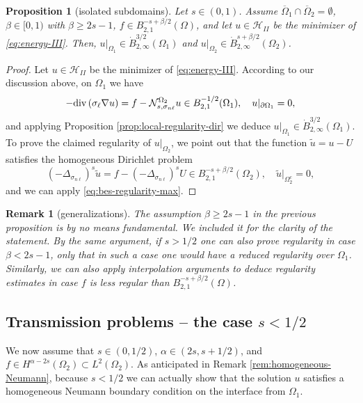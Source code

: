 \documentclass{amsart}
\newcommand{\Ol}{\Omega_{1}}%
\newcommand{\Onl}{\Omega_{2}}%
\renewcommand{\sl}{{\sigma_\ell}}
\newcommand{\snl}{{\sigma_{n\ell}}}
\def\calH{\mathcal{H}}
\newcommand{\Nsnl}{\mathcal{N}_{s,\snl}}
\renewcommand{\div}{{\rm div}\,}
\theoremstyle{plain}
\newtheorem{proposition}{Proposition}
\newtheorem{remark}{Remark}
\numberwithin{equation}{section}
\numberwithin{table}{section}
\numberwithin{figure}{section}
\numberwithin{theorem}{section}
\numberwithin{corollary}{section}
\numberwithin{definition}{section}
\numberwithin{lemma}{section}
\numberwithin{proposition}{section}
\numberwithin{remark}{section}
\begin{document}
\begin{proposition}[isolated subdomains] \label{prop:reg-isolated}
Let $s \in (0,1)$.
Assume $\overline\Ol \cap \overline \Onl = \emptyset$, $\beta \in [0,1)$ with $\beta \ge 2s - 1$, $f \in B^{-s+\beta/2}_{2,1}(\Omega)$, and let $u \in \calH_{II}$ be the minimizer of \eqref{eq:energy-III}. Then, $u|_{\Ol} \in \dot B^{3/2}_{2,\infty}(\Ol)$ and $u|_{\Onl} \in \dot B^{s+\beta/2}_{2,\infty}(\Onl)$.
\end{proposition}
\begin{proof}
Let $u \in \calH_{II}$ be the minimizer of \eqref{eq:energy-III}. According to our discussion above, on $\Ol$ we have
\[
-\div (\sl \nabla u)  = f  - \Nsnl^{\Onl} u \in B^{-1/2}_{2,1}(\Ol), \quad u |_{\partial \Ol} = 0,
\]
and applying Proposition \ref{prop:local-regularity-dir} we deduce $u|_{\Ol} \in \dot B^{3/2}_{2,\infty}(\Ol)$. To prove the claimed regularity of $u|_{\Onl}$, we point out that the function $\tilde u = u - U$ satisfies the homogeneous Dirichlet problem
\[
(-\Delta_\snl)^s \tilde{u}  = f  - (-\Delta_\snl)^s U \in B^{-s+\beta/2}_{2,1}(\Onl), \quad \tilde{u} |_{\Onl^c} = 0,
\]
and we can apply \eqref{eq:bes-regularity-max}.
\end{proof}

\begin{remark}[generalizations] 
The assumption $\beta \ge 2s - 1$ in the previous proposition is by no means fundamental. We included it for the clarity of the statement. By the same argument, if $s>1/2$ one can also prove regularity in case $\beta < 2s - 1$, only that in such a case one would have a reduced regularity over $\Ol$. Similarly, we can also apply interpolation arguments to deduce regularity estimates in case $f$ is less regular than $B^{-s+\beta/2}_{2,1}(\Omega)$. 
\end{remark}


\subsection{Transmission problems -- the case $s < 1/2$} \label{sec:regularity-small-s}
We now assume that $s \in (0,1/2)$,  $\alpha \in (2s, s+1/2)$, and $f \in H^{\alpha - 2s}(\Onl) \subset L^2(\Onl)$.
%
As anticipated in Remark \ref{rem:homogeneous-Neumann}, because $s<1/2$ we can actually show that the solution $u$ satisfies a homogeneous Neumann boundary condition on the interface from $\Ol$. 
\end{document}
